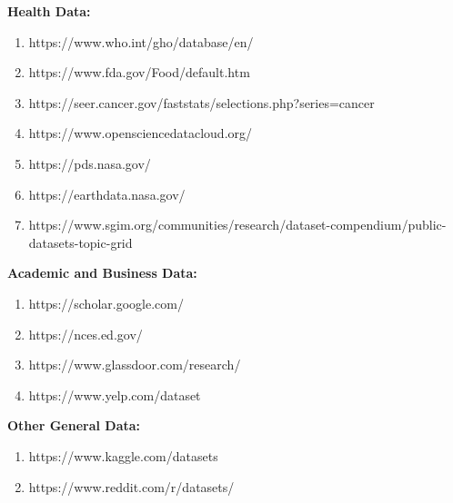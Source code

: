\documentclass{article}
\begin{document}
\textbf{Health Data: }

\begin{enumerate} 
    \item https://www.who.int/gho/database/en/
    \item https://www.fda.gov/Food/default.htm
    \item https://seer.cancer.gov/faststats/selections.php?series=cancer
    \item https://www.opensciencedatacloud.org/
    \item https://pds.nasa.gov/
    \item https://earthdata.nasa.gov/
    \item https://www.sgim.org/communities/research/dataset-compendium/public-datasets-topic-grid 
\end{enumerate}
 
\textbf{Academic and Business Data:}
\begin{enumerate} 
    \item  https://scholar.google.com/
    \item  https://nces.ed.gov/
    \item  https://www.glassdoor.com/research/
    \item  https://www.yelp.com/dataset 
\end{enumerate}
 
\textbf{Other General Data:}

\begin{enumerate} 
    \item https://www.kaggle.com/datasets
    \item https://www.reddit.com/r/datasets/
\end{enumerate}
 
\end{document}
